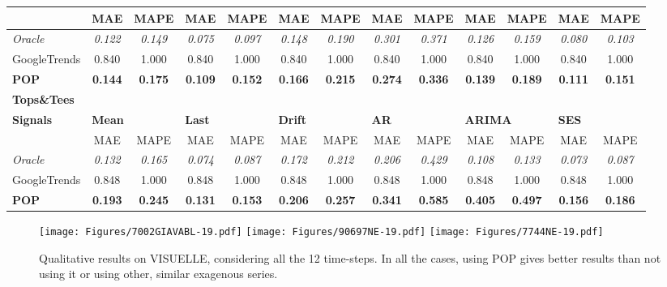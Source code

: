 \documentclass[runningheads]{llncs}
\begin{document}
\begin{table}[h!]
{\begin{tabular}{|l|c c|c c|c c|c c|c c|c c|}
    &MAE&MAPE&MAE&MAPE&MAE&MAPE&MAE&MAPE&MAE&MAPE&MAE&MAPE\\ \hline
    \emph{Oracle}&\emph{0.122}&\emph{0.149}&\emph{0.075}&\emph{0.097}&\emph{0.148}&\emph{0.190}&\emph{0.301}&\emph{0.371}&\emph{0.126}&\emph{0.159}&\emph{0.080}&\emph{0.103}\\\hline
    GoogleTrends&0.840&1.000&0.840&1.000&0.840&1.000&0.840&1.000&0.840&1.000&0.840&1.000\\\hline
    \textbf{POP}&\textbf{0.144}&\textbf{0.175}&\textbf{0.109}&\textbf{0.152}&\textbf{0.166}&\textbf{0.215}&\textbf{0.274}&\textbf{0.336}&\textbf{0.139}&\textbf{0.189}&\textbf{0.111}&\textbf{0.151}\\ \hline\hline
    \multicolumn{13}{|l|}{\hfil\textbf{Tops\&Tees}}\\
    \hline
    \textbf{Signals}&\multicolumn{2}{l|}{\hfil\textbf{Mean}}&\multicolumn{2}{l|}{\hfil\textbf{Last}}&\multicolumn{2}{l|}{\hfil\textbf{Drift}}&\multicolumn{2}{l|}{\hfil\textbf{AR}}&\multicolumn{2}{l|}{\hfil\textbf{ARIMA}}&\multicolumn{2}{l|}{\hfil\textbf{SES}}\\
    &MAE&MAPE&MAE&MAPE&MAE&MAPE&MAE&MAPE&MAE&MAPE&MAE&MAPE\\ \hline
    \emph{Oracle}&\emph{0.132}&\emph{0.165}&\emph{0.074}&\emph{0.087}&\emph{0.172}&\emph{0.212}&\emph{0.206}&\emph{0.429}&\emph{0.108}&\emph{0.133}&\emph{0.073}&\emph{0.087}\\\hline
    GoogleTrends&0.848&1.000&0.848&1.000&0.848&1.000&0.848&1.000&0.848&1.000&0.848&1.000\\\hline
    \textbf{POP}&\textbf{0.193}&\textbf{0.245}&\textbf{0.131}&\textbf{0.153}&\textbf{0.206}&\textbf{0.257}&\textbf{0.341}&\textbf{0.585}&\textbf{0.405}&\textbf{0.497}&\textbf{0.156}&\textbf{0.186}\\\hline
    \end{tabular}}  
    \label{tab:ff_res_supp}
\end{table}


\begin{figure}[t!]
    \begin{center}
            \texttt{[image: Figures/7002GIAVABL-19.pdf]}
            \texttt{[image: Figures/90697NE-19.pdf]}
            \texttt{[image: Figures/7744NE-19.pdf]}
\end{center}
    \caption{\label{fig:qlt_visuelle_supp} Qualitative results on VISUELLE, considering all the 12 time-steps. In all the cases, using POP gives better results than not using it or using other, similar exagenous series.}
\end{figure}
\end{document}
